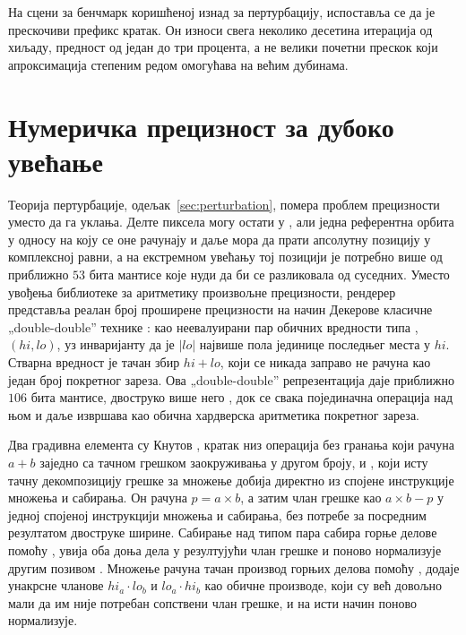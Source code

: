 \documentclass[serbian]{ftndiplomski}
\begin{document}
На сцени за бенчмарк коришћеној изнад за пертурбацију, испоставља се да је прескочиви
префикс кратак. Он износи свега неколико десетина итерација од хиљаду, предност од
један до три процента, а не велики почетни прескок који апроксимација степеним редом
омогућава на већим дубинама.

\section{Нумеричка прецизност за дубоко увећање}
\label{sec:precision}

Теорија пертурбације, одељак~\ref{sec:perturbation}, помера проблем прецизности
уместо да га уклања. Делте пиксела могу остати у , али једна референтна
орбита у односу на коју се оне рачунају и даље мора да прати апсолутну позицију у
комплексној равни, а на екстремном увећању тој позицији је потребно више од приближно
$53$ бита мантисе које нуди  да би се разликовала од суседних. Уместо
увођења библиотеке за аритметику произвољне прецизности, рендерер представља реалан
број проширене прецизности на начин Декерове класичне „double-double'' технике
\cite{dekker1971}: као неевалуирани пар обичних вредности типа , $(hi,
lo)$, уз инваријанту да је $|lo|$ највише пола јединице последњег места у $hi$.
Стварна вредност је тачан збир $hi + lo$, који се никада заправо не рачуна као један
број покретног зареза. Ова „double-double'' репрезентација даје приближно $106$ бита
мантисе, двоструко више него , док се свака појединачна операција над њом и
даље извршава као обична хардверска аритметика покретног зареза.

Два градивна елемента су Кнутов  \cite{knuth1997seminumerical}, кратак
низ операција без гранања који рачуна $a+b$ заједно са тачном грешком заокруживања у
другом броју, и  \cite{ogitarumpoishi2005}, који исту тачну
декомпозицију грешке за множење добија директно из спојене инструкције множења и
сабирања. Он рачуна $p = a \times b$, а затим члан грешке као $a \times b - p$ у једној
спојеној инструкцији множења и сабирања, без потребе за посредним резултатом двоструке
ширине. Сабирање над типом пара сабира горње делове помоћу , увија оба
доња дела у резултујући члан грешке и поново нормализује другим позивом .
Множење рачуна тачан производ горњих делова помоћу , додаје унакрсне
чланове $hi_a \cdot lo_b$ и $lo_a \cdot hi_b$ као обичне  производе, који су
већ довољно мали да им није потребан сопствени члан грешке, и на исти начин поново
нормализује.
\end{document}
